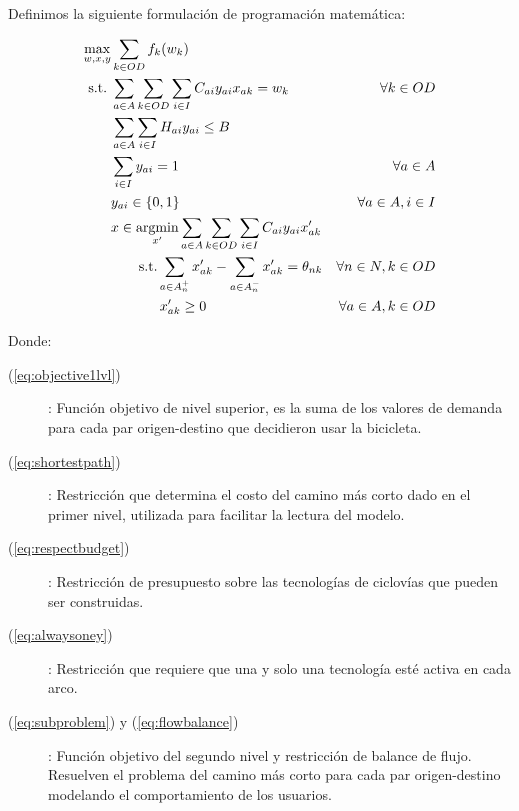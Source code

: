 Definimos la siguiente formulación de programación matemática:

\begin{align}
  \max_{w,x,y}   & \sum_{k \in OD} f_k(w_k)                                                         & \label{eq:objective1lvl} \\
  \text{s.t.}\;  & \sum_{a \in A} \sum_{k \in OD} \sum_{i \in I} C_{ai}y_{ai}x_{ak} = w_k           & \forall k \in OD \label{eq:shortestpath} \\
                 & \sum_{a \in A} \sum_{i \in I} H_{ai}y_{ai} \leq B                                & \label{eq:respectbudget} \\
                 & \sum_{i \in I} y_{ai} = 1                                                        & \forall a \in A \label{eq:alwaysoney} \\
                 & y_{ai} \in \{0,1\}                                                               & \forall a \in A, i \in I \nonumber \\
                 & x \in \mathop{\mathrm{argmin}}_{x'} \sum_{a \in A} \sum_{k \in OD} \sum_{i \in I} C_{ai}y_{ai}x'_{ak}  & \label{eq:subproblem} \\
                 & \qquad \text{s.t.} \sum_{a \in A_n^+} x'_{ak} - \sum_{a \in A_n^-} x'_{ak} = \theta_{nk}   & \forall n \in N, k \in OD \label{eq:flowbalance} \\
                 & \qquad \hspace{1.5em} x'_{ak} \geq 0                                                          & \forall a \in A, k \in OD \nonumber
\end{align}

Donde:

\begin{description}
  \item[(\ref{eq:objective1lvl})]: Función objetivo de nivel superior, es la suma de los valores de demanda para cada par origen-destino que decidieron usar la bicicleta.
  \item[(\ref{eq:shortestpath})]: Restricción que determina el costo del camino más corto dado en el primer nivel, utilizada para facilitar la lectura del modelo.
  \item[(\ref{eq:respectbudget})]: Restricción de presupuesto sobre las tecnologías de ciclovías que pueden ser construidas.
  \item[(\ref{eq:alwaysoney})]: Restricción que requiere que una y solo una tecnología esté activa en cada arco.
  \item[(\ref{eq:subproblem}) y (\ref{eq:flowbalance})]: Función objetivo del segundo nivel y restricción de balance de flujo. Resuelven el problema del camino más corto para cada par origen-destino modelando el comportamiento de los usuarios.
\end{description}

